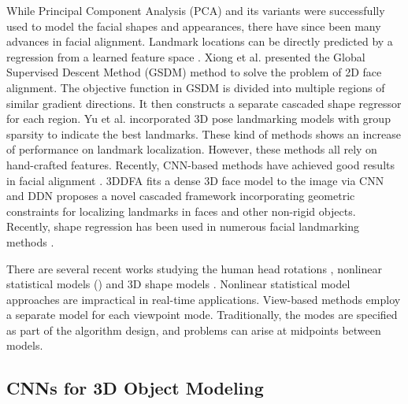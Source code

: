 \documentclass[10pt,twocolumn,letterpaper]{article}
\begin{document}
While Principal Component Analysis (PCA) and its variants \cite{cootes1995active, cootes2001active, cristinacce2008automatic} were successfully used to model the facial shapes and appearances, there have since been many advances in facial alignment.  Landmark locations can be directly predicted by a regression from a learned feature space \cite{cao2014face, dantone2012real, xiong2013supervised}. Xiong et al. \cite{xiong2015global} presented the Global Supervised Descent Method (GSDM) method to solve the problem of 2D face alignment. The objective function in GSDM is divided into multiple regions of similar gradient directions. It then constructs a separate cascaded shape regressor for each region. Yu et al. \cite{yu2013pose} incorporated 3D pose landmarking models with group sparsity to indicate the best landmarks. These kind of methods shows an increase of performance on landmark localization. However, these methods all rely on hand-crafted features. 
Recently, CNN-based methods have achieved good results in facial alignment \cite{Zhu16falp, yu2016deep}. 3DDFA \cite{Zhu16falp} fits a dense 3D face model to the image via CNN and DDN \cite{yu2016deep} proposes a novel cascaded framework incorporating geometric constraints for localizing landmarks in faces and other non-rigid objects. Recently, shape regression has been used in numerous facial landmarking methods \cite{Tzimiropoulos2015, RenICCV2014, Artizzu2013}. 





There are several recent works studying the human head rotations \cite{Cootes2015, Zhu2012}, nonlinear statistical models (\cite{Duong2015BeyondPC}) and 3D shape models \cite{Cao2013, Gu2006}. Nonlinear statistical model approaches are impractical in real-time applications. View-based methods employ a separate model for each viewpoint mode. Traditionally, the modes are specified as part of the algorithm design, and problems can arise at midpoints between models. 





\subsection{CNNs for 3D Object Modeling}
\end{document}
